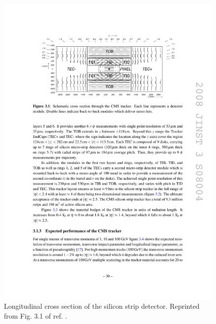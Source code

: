 \documentclass[dissertation.tex]{subfiles}
\begin{document}
\begin{figure}
	\centering
	\includegraphics[scale=1.0]{strip_longitudinal_xsec}
	\caption{Longitudinal cross section of the silicon strip detector.  Reprinted from Fig. 3.1 of ref. \cite{CMS_detector_paper}.}
	\label{fig:strip_longitudinal_xsec}
\end{figure}
\end{document}
